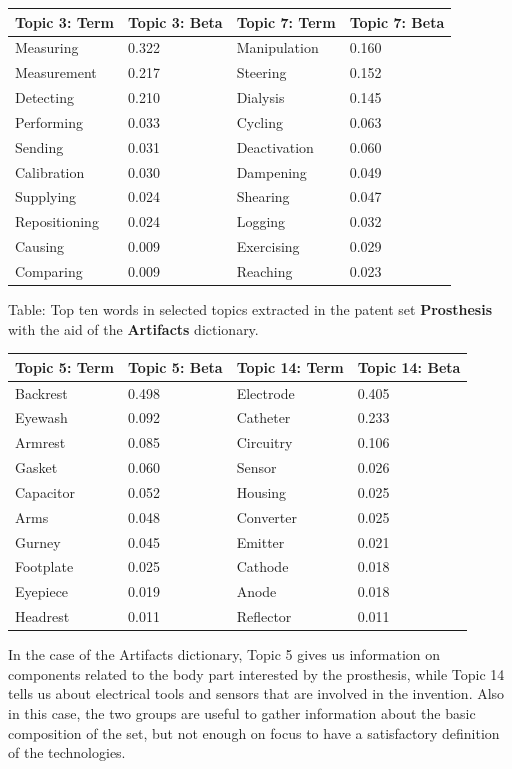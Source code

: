 \documentclass[]{book}
\begin{document}
\begin{tabular}{l|l|l|l}
\hline
Topic 3: Term & Topic 3: Beta & Topic 7: Term & Topic 7: Beta\\
\hline
Measuring & 0.322 & Manipulation & 0.160\\
\hline
Measurement & 0.217 & Steering & 0.152\\
\hline
Detecting & 0.210 & Dialysis & 0.145\\
\hline
Performing & 0.033 & Cycling & 0.063\\
\hline
Sending & 0.031 & Deactivation & 0.060\\
\hline
Calibration & 0.030 & Dampening & 0.049\\
\hline
Supplying & 0.024 & Shearing & 0.047\\
\hline
Repositioning & 0.024 & Logging & 0.032\\
\hline
Causing & 0.009 & Exercising & 0.029\\
\hline
Comparing & 0.009 & Reaching & 0.023\\
\hline
\end{tabular}

Table: \label{tab:arttopicresults} Top ten words in selected topics
extracted in the patent set \textbf{Prosthesis} with the aid of the
\textbf{Artifacts} dictionary.

\begin{tabular}{l|l|l|l}
\hline
Topic 5: Term & Topic 5: Beta & Topic 14: Term & Topic 14: Beta\\
\hline
Backrest & 0.498 & Electrode & 0.405\\
\hline
Eyewash & 0.092 & Catheter & 0.233\\
\hline
Armrest & 0.085 & Circuitry & 0.106\\
\hline
Gasket & 0.060 & Sensor & 0.026\\
\hline
Capacitor & 0.052 & Housing & 0.025\\
\hline
Arms & 0.048 & Converter & 0.025\\
\hline
Gurney & 0.045 & Emitter & 0.021\\
\hline
Footplate & 0.025 & Cathode & 0.018\\
\hline
Eyepiece & 0.019 & Anode & 0.018\\
\hline
Headrest & 0.011 & Reflector & 0.011\\
\hline
\end{tabular}

In the case of the Artifacts dictionary, Topic 5 gives us information on
components related to the body part interested by the prosthesis, while
Topic 14 tells us about electrical tools and sensors that are involved
in the invention. Also in this case, the two groups are useful to gather
information about the basic composition of the set, but not enough on
focus to have a satisfactory definition of the technologies.
\end{document}
